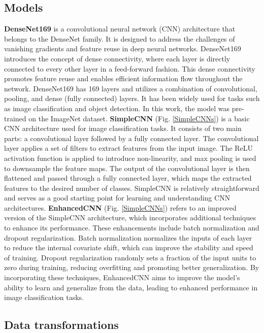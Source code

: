\documentclass[runningheads]{llncs}
\begin{document}
\subsection{Models}
\textbf{DenseNet169} is a convolutional neural network (CNN) architecture that belongs to the DenseNet family. It is designed to address the challenges of vanishing gradients and feature reuse in deep neural networks. DenseNet169 introduces the concept of dense connectivity, where each layer is directly connected to every other layer in a feed-forward fashion. This dense connectivity promotes feature reuse and enables efficient information flow throughout the network. DenseNet169 has 169 layers and utilizes a combination of convolutional, pooling, and dense (fully connected) layers. It has been widely used for tasks such as image classification and object detection. In this work, the model was pre-trained on the ImageNet dataset.
\newline
\textbf{SimpleCNN} (Fig. \ref{SimpleCNNs}) is a basic CNN architecture used for image classification tasks. It consists of two main parts: a convolutional layer followed by a fully connected layer. The convolutional layer applies a set of filters to extract features from the input image. The ReLU activation function is applied to introduce non-linearity, and max pooling is used to downsample the feature maps. The output of the convolutional layer is then flattened and passed through a fully connected layer, which maps the extracted features to the desired number of classes. SimpleCNN is relatively straightforward and serves as a good starting point for learning and understanding CNN architectures.
\newline
\textbf{EnhancedCNN} (Fig. \ref{SimpleCNNs}) refers to an improved version of the SimpleCNN architecture, which incorporates additional techniques to enhance its performance. These enhancements include batch normalization and dropout regularization. Batch normalization normalizes the inputs of each layer to reduce the internal covariate shift, which can improve the stability and speed of training. Dropout regularization randomly sets a fraction of the input units to zero during training, reducing overfitting and promoting better generalization. By incorporating these techniques, EnhancedCNN aims to improve the model's ability to learn and generalize from the data, leading to enhanced performance in image classification tasks.

\subsection{Data transformations}
\end{document}
